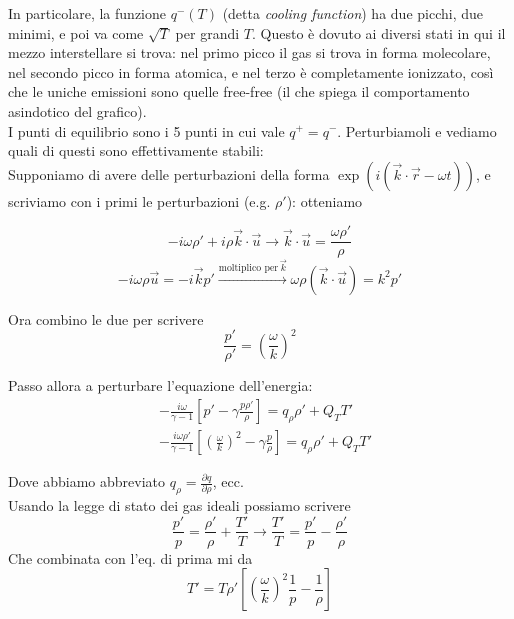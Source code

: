 \documentclass{report}
\begin{document}
In particolare, la funzione $q^-(T)$ (detta \emph{cooling function}) ha due picchi, due minimi, e poi va come $\sqrt{T}$ per grandi $T$. Questo è dovuto ai diversi stati in qui il mezzo interstellare si trova: nel primo picco il gas si trova in forma molecolare, nel secondo picco in forma atomica, e nel terzo è completamente ionizzato, così che le uniche emissioni sono quelle free-free (il che spiega il comportamento asindotico del grafico). \\

I punti di equilibrio sono i 5 punti in cui vale $q^+ = q^-$. Perturbiamoli e vediamo quali di questi sono effettivamente stabili: \\

Supponiamo di avere delle perturbazioni della forma $\exp(i(\vec{k}\cdot \vec{r}- \omega t))$, e scriviamo con i primi le perturbazioni (e.g. $\rho'$): otteniamo

\begin{equation}
    -i\omega \rho' + i \rho \vec{k}\cdot \vec{u} \rightarrow \vec{k}\cdot \vec{u} = \frac{\omega\rho'}{\rho}
\end{equation}
\begin{equation}
    -i\omega \rho \vec{u} = -i\vec{k} p' \xrightarrow{\text{moltiplico per} \, \vec{k}} \omega\rho (\vec{k}\cdot \vec{u}) = k^2p'
\end{equation}

Ora combino le due per scrivere 
\begin{equation}
    \frac{p'}{\rho'} = \left(\frac{\omega}{k} \right)^2
\end{equation}

Passo allora a perturbare l'equazione dell'energia: 
\begin{align}
    &-\frac{i\omega}{\gamma -1}\left[p' - \gamma \frac{p\rho'}{\rho}\right] = q_\rho \rho' + Q_T T' \\ 
    &-\frac{i\omega\rho'}{\gamma -1}\left[\left(\frac{\omega}{k}\right)^2 - \gamma \frac{p}{\rho}\right] = q_\rho \rho' + Q_T T'
\end{align}

Dove abbiamo abbreviato $q_\rho = \frac{\partial q}{\partial \rho}$, ecc. \\
Usando la legge di stato dei gas ideali possiamo scrivere 
\begin{equation}
    \frac{p'}{p} = \frac{\rho'}{\rho} + \frac{T'}{T} \rightarrow \frac{T'}{T} = \frac{p'}{p} - \frac{\rho'}{\rho}
\end{equation}
Che combinata con l'eq. di prima mi da 
\begin{equation}
    T' = T\rho'\left[\left(\frac{\omega}{k} \right)^2\frac{1}{p} - \frac{1}{\rho}\right]
\end{equation}
\end{document}
